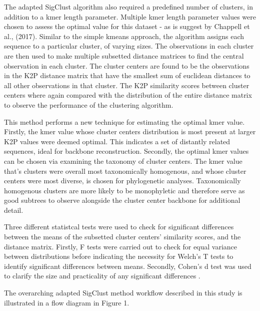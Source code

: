 \documentclass[12pt]{article}
\begin{document}
  The adapted SigClust algorithm also required a predefined number of clusters, in addition to a kmer length parameter. Multiple kmer length parameter values were chosen to assess the optimal value for this dataset - as is suggest by Chappell et al., (2017). Similar to the simple kmeans approach, the algorithm assigns each sequence to a particular cluster, of varying sizes. The observations in each cluster are then used to make multiple subsetted distance matrices to find the central observation in each cluster. The cluster centers are found to be the observations in the K2P distance matrix that have the smallest sum of euclidean distances to all other observations in that cluster. The K2P similarity scores between cluster centers where again compared with the distribution of the entire distance matrix to observe the performance of the clustering algorithm. 

  This method performs a new technique for estimating the optimal kmer value. Firstly, the kmer value whose cluster centers distribution is most present at larger K2P values were deemed optimal. This indicates a set of distantly related sequences, ideal for backbone reconstruction. Secondly, the optimal kmer values can be chosen via examining the taxonomy of cluster centers. The kmer value that's clusters were overall most taxonomically homogenous, and whose cluster centers were most diverse, is chosen for phylogenetic analyses. Taxonomically homogenous clusters are more likely to be monophyletic and therefore serve as good subtrees to observe alongside the cluster center backbone for additional detail.

  Three different statistcal tests were used to check for significant differences between the means of the subsetted cluster centers' similarity scores, and the distance matrix. Firstly, F tests were carried out to check for equal variance between distributions before indicating the necessity for Welch's T tests to identify significant differences between means. Secondly, Cohen's d test was used to clarify the size and practicality of any significant differences \cite{Aoki2020}.

  The overarching adapted SigClust method workflow described in this study is illustrated in a flow diagram in Figure 1.
\end{document}
